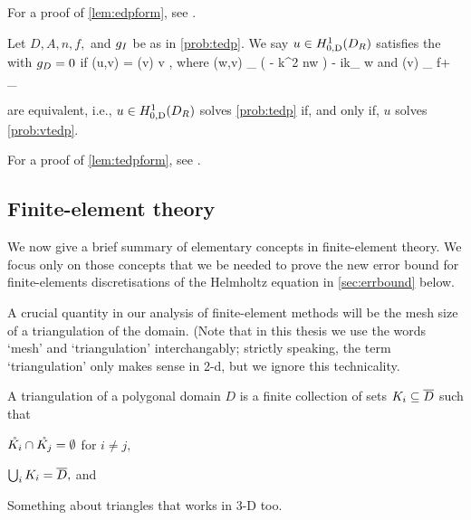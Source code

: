 For a proof of \cref{lem:edpform}, see \cite[Lemma 3.3]{GrPeSp:19}.

\bprob[Variational formulation of TEDP when $\gD = 0$]\label{prob:vtedp}
Let $D, A, n, f,$ and $g_{I}$ be as in \cref{prob:tedp}. We say $u \in \HozDDR$ satisfies the  with $\gD = 0$ if
\beqs
\aT(u,v) = \FT(v) \tfa v \in \HozDDR,
\eeqs
where
\beqs
\aT(w,v) \de \int_{\DR} \mleft( - k^2 n\minispace w \vbar\mright) - ik\int_{\GI} \trGI w\minispace\trGI \vbar
\eeqs
and
\beqs
\FT(v) \de \int_{\DR} f\minispace\vbar + \int_{\GI} \gI \minispace\trGI \vbar
\eeqs
\eprob
{}

\label{lem:tedpform}
 are equivalent, i.e., $u \in \HozDDR$ solves \cref{prob:tedp} if, and only if, $u$ solves \cref{prob:vtedp}.
\ele

For a proof of \cref{lem:tedpform}, see \cite[Lemma A.7]{GrPeSp:19}.
  
\subsection{Finite-element theory}\label{sec:fetheory}

We now give a brief summary of elementary concepts in finite-element theory. We focus only on those concepts that we be needed to
prove the new error bound for finite-elements discretisations of the Helmholtz equation in \cref{sec:errbound} below.

    A crucial quantity in our analysis of finite-element methods will be the mesh size of a triangulation of the domain. (Note that in this thesis we use the words `mesh' and `triangulation' interchangably; strictly speaking, the term `triangulation' only makes sense in 2-d, but we ignore this technicality.

    \bde[Triangulation]
    A triangulation of a polygonal domain $D$ is a finite collection of sets $K_{i} \subseteq \overline{D}$ such that
    \ben
  \item $\mathring{K_{i}} \cap \mathring{K_{j}} = \emptyset$ for $ i \neq j,$
  \item $\bigcup_i K_{i} = \overline{D},$ and
    \item Something about triangles that works in 3-D too.
    \een
    \ede

